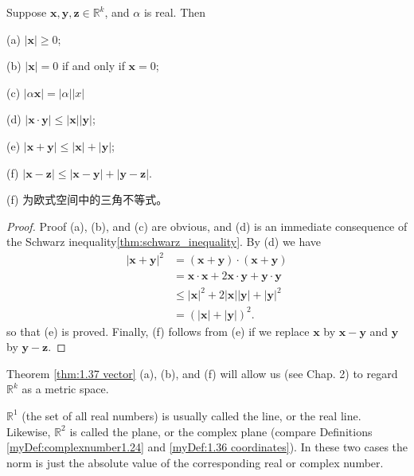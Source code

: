 \begin{thm}\label{thm:1.37 vector}
    Suppose $\mathbf{x}, \mathbf{y}, \mathbf{z}\in\mathbb{R}^k$, and $\alpha$ is real. Then

(a) $| \mathbf{x}| \geq 0$;

(b) $| \mathbf{x}| = 0$ if and only if $\mathbf{x} =0$;

(c) $| \alpha \mathbf{x}| = | \alpha||x|$

(d) $|\mathbf{x}\cdot\mathbf{y}| \leq  |\mathbf{x}| | \mathbf{y}|$;

(e) $|\mathbf{x}+\mathbf{y}| \leq | \mathbf{x} | + | \mathbf{y}|$;

(f) $|\mathbf{x}-\mathbf{z}| \leq |\mathbf{x}-\mathbf{y}| + |\mathbf{y}-\mathbf{z}|$.
\end{thm}

(f) 为欧式空间中的三角不等式。

\begin{proof}
    Proof (a), (b), and (c) are obvious, and (d) is an immediate consequence of the Schwarz inequality\ref{thm:schwarz_inequality}. By (d) we have 
    \begin{align*}
        |\mathbf{x} + \mathbf{y}|^2
        &= (\mathbf{x} + \mathbf{y}) \cdot (\mathbf{x} + \mathbf{y})\\
        &= \mathbf{x} \cdot \mathbf{x} + 2\mathbf{x} \cdot \mathbf{y} + \mathbf{y} \cdot \mathbf{y}\\
        &\leq |\mathbf{x}|^2 + 2|\mathbf{x}||\mathbf{y}| + |\mathbf{y}|^2\\
        &= \left(|\mathbf{x}| + |\mathbf{y}|\right)^2.
    \end{align*}
    so that (e) is proved. Finally, (f) follows from (e) if we replace $\mathbf{x}$ by $\mathbf{x}-\mathbf{y}$ and $\mathbf{y}$ by $\mathbf{y}-\mathbf{z}$.
\end{proof}

\begin{myRemark}\label{myRemark:1.38}
    Theorem \ref{thm:1.37 vector} (a), (b), and (f) will allow us (see Chap. 2) to
    regard $\mathbb{R}^k$ as a metric space.
    
    $\mathbb{R}^1$ (the set of all real numbers) is usually called the line, or the real line. Likewise, $\mathbb{R}^2$ is called the plane, or the complex plane (compare Definitions \ref{myDef:complexnumber1.24} and \ref{myDef:1.36 coordinates}). In these two cases the norm is just the absolute value of the corresponding real or complex number. 
\end{myRemark}
